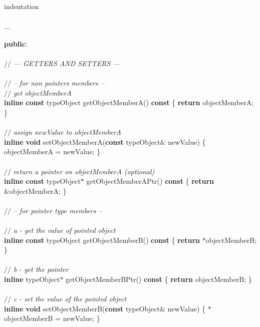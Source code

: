 %
%
\expandafter\ifx\csname indentation\endcsname\relax%
\newlength{\indentation}\fi
\setlength{\indentation}{0.5em}
\begin{flushleft}
\mbox{}\\
$\ldots$ \mbox{}\\
\mbox{}\\
{\bf public}:\mbox{}\\
\mbox{}\\
{$//$\it{} --- GETTERS AND SETTERS ---{}\mbox{}\\
}\mbox{}\\
{$//$\it{} -- for non pointers members --{}\mbox{}\\
}{$//$\it{} get objectMemberA{}\mbox{}\\
}{\bf inline} {\bf const} typeObject getObjectMemberA() {\bf const} \{ {\bf return} objectMemberA; \}\mbox{}\\
\hspace*{8\indentation}\mbox{}\\
{$//$\it{} assign newValue to objectMemberA {}\mbox{}\\
}{\bf inline} {\bf void} setObjectMemberA({\bf const} typeObject\& newValue) \{ objectMemberA = newValue; \}\mbox{}\\
\mbox{}\\
{$//$\it{} return a pointer on objectMemberA (optional){}\mbox{}\\
}{\bf inline} {\bf const} typeObject$\ast$ getObjectMemberAPtr() {\bf const} \{ {\bf return} \&objectMemberA; \}\mbox{}\\
\mbox{}\\
{$//$\it{} -- for pointer type members --{}\mbox{}\\
}\mbox{}\\
{$//$\it{} a - get the value of pointed object {}\mbox{}\\
}{\bf inline} {\bf const} typeObject getObjectMemberB() {\bf const} \{ {\bf return} $\ast$objectMemberB; \}\mbox{}\\
\mbox{}\\
{$//$\it{} b - get the pointer {}\mbox{}\\
}{\bf inline} typeObject$\ast$ getObjectMemberBPtr() {\bf const} \{ {\bf return} objectMemberB; \}\mbox{}\\
\mbox{}\\
{$//$\it{} c - set the value of the pointed object{}\mbox{}\\
}{\bf inline} {\bf void} setObjectMemberB({\bf const} typeObject\& newValue) \{ $\ast$objectMemberB = newValue; \}\mbox{}\\

\end{flushleft}
